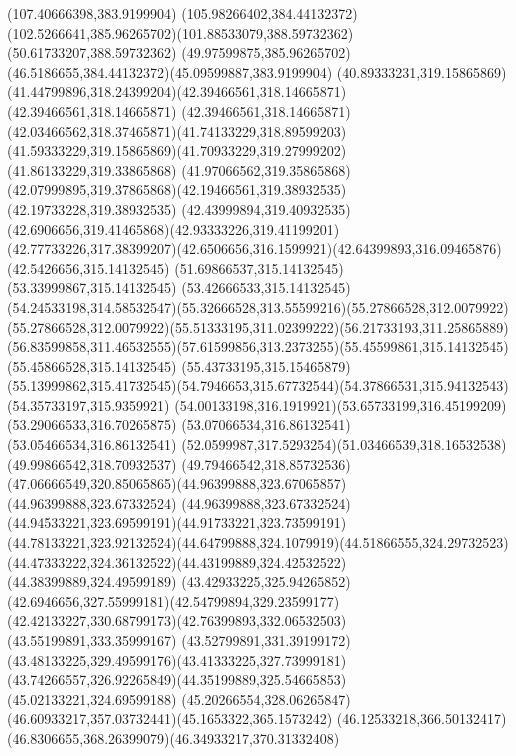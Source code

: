 {{		\lineto(107.40666398,383.9199904)
		\curveto(105.98266402,384.44132372)(102.5266641,385.96265702)(101.88533079,388.59732362)
		\lineto(50.61733207,388.59732362)
		\curveto(49.97599875,385.96265702)(46.5186655,384.44132372)(45.09599887,383.9199904)
		\closepath
		\moveto(40.89333231,319.15865869)
		\curveto(41.44799896,318.24399204)(42.39466561,318.14665871)(42.39466561,318.14665871)
		\curveto(42.39466561,318.14665871)(42.03466562,318.37465871)(41.74133229,318.89599203)
		\curveto(41.59333229,319.15865869)(41.70933229,319.27999202)(41.86133229,319.33865868)
		\curveto(41.97066562,319.35865868)(42.07999895,319.37865868)(42.19466561,319.38932535)
		\lineto(42.19733228,319.38932535)
		\curveto(42.43999894,319.40932535)(42.6906656,319.41465868)(42.93333226,319.41199201)
		\curveto(42.77733226,317.38399207)(42.6506656,316.1599921)(42.64399893,316.09465876)
		\lineto(42.5426656,315.14132545)
		\lineto(51.69866537,315.14132545)
		\lineto(53.33999867,315.14132545)
		\lineto(53.42666533,315.14132545)
		\curveto(54.24533198,314.58532547)(55.32666528,313.55599216)(55.27866528,312.0079922)
		\curveto(55.27866528,312.0079922)(55.51333195,311.02399222)(56.21733193,311.25865889)
		\curveto(56.83599858,311.46532555)(57.61599856,313.2373255)(55.45599861,315.14132545)
		\lineto(55.45866528,315.14132545)
		\lineto(55.43733195,315.15465879)
		\curveto(55.13999862,315.41732545)(54.7946653,315.67732544)(54.37866531,315.94132543)
		\lineto(54.35733197,315.9359921)
		\curveto(54.00133198,316.1919921)(53.65733199,316.45199209)(53.29066533,316.70265875)
		\lineto(53.07066534,316.86132541)
		\lineto(53.05466534,316.86132541)
		\curveto(52.0599987,317.5293254)(51.03466539,318.16532538)(49.99866542,318.70932537)
		\curveto(49.79466542,318.85732536)(47.06666549,320.85065865)(44.96399888,323.67065857)
		\lineto(44.96399888,323.67332524)
		\curveto(44.96399888,323.67332524)(44.94533221,323.69599191)(44.91733221,323.73599191)
		\curveto(44.78133221,323.92132524)(44.64799888,324.1079919)(44.51866555,324.29732523)
		\curveto(44.47333222,324.36132522)(44.43199889,324.42532522)(44.38399889,324.49599189)
		\curveto(43.42933225,325.94265852)(42.6946656,327.55999181)(42.54799894,329.23599177)
		\curveto(42.42133227,330.68799173)(42.76399893,332.06532503)(43.55199891,333.35999167)
		\curveto(43.52799891,331.39199172)(43.48133225,329.49599176)(43.41333225,327.73999181)
		\curveto(43.74266557,326.92265849)(44.35199889,325.54665853)(45.02133221,324.69599188)
		\curveto(45.20266554,328.06265847)(46.60933217,357.03732441)(45.1653322,365.1573242)
		\curveto(46.12533218,366.50132417)(46.8306655,368.26399079)(46.34933217,370.31332408)
}}
